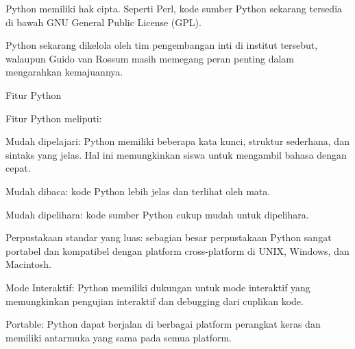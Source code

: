 \vspace{14pt}
\noindent 
{\fontsize{14pt}{14pt}\selectfont Python memiliki hak cipta. Seperti Perl, kode sumber Python sekarang tersedia di bawah GNU General Public License (GPL). \\} \par
\vspace{14pt}
\noindent 
{\fontsize{14pt}{14pt}\selectfont Python sekarang dikelola oleh tim pengembangan inti di institut tersebut, walaupun Guido van Rossum masih memegang peran penting dalam mengarahkan kemajuannya. \\} \par
\vspace{14pt}
\noindent 
{\fontsize{14pt}{14pt}\selectfont Fitur Python \\} \par
\noindent 
{\fontsize{14pt}{14pt}\selectfont Fitur Python meliputi: \\} \par
\vspace{14pt}
\noindent 
{\fontsize{14pt}{14pt}\selectfont Mudah dipelajari: Python memiliki beberapa kata kunci, struktur sederhana, dan sintaks yang jelas. Hal ini memungkinkan siswa untuk mengambil bahasa dengan cepat. \\} \par
\vspace{14pt}
\noindent 
{\fontsize{14pt}{14pt}\selectfont Mudah dibaca: kode Python lebih jelas dan terlihat oleh mata. \\} \par
\vspace{14pt}
\noindent 
{\fontsize{14pt}{14pt}\selectfont Mudah dipelihara: kode sumber Python cukup mudah untuk dipelihara. \\} \par
\vspace{14pt}
\noindent 
{\fontsize{14pt}{14pt}\selectfont Perpustakaan standar yang luas: sebagian besar perpustakaan Python sangat portabel dan kompatibel dengan platform cross-platform di UNIX, Windows, dan Macintosh. \\} \par
\noindent 
{\fontsize{14pt}{14pt}\selectfont Mode Interaktif: Python memiliki dukungan untuk mode interaktif yang memungkinkan pengujian interaktif dan debugging dari cuplikan kode. \\} \par
\vspace{14pt}
\noindent 
{\fontsize{14pt}{14pt}\selectfont Portable: Python dapat berjalan di berbagai platform perangkat keras dan memiliki antarmuka yang sama pada semua platform. \\} \par
